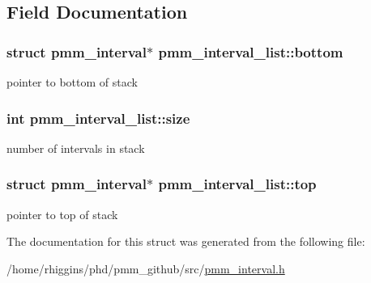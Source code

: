 \subsection{Field Documentation}
\hypertarget{structpmm__interval__list_ab3a8d91a9f36e0cf7d50aede9b0fc238}{
\subsubsection[{bottom}]{\setlength{\rightskip}{0pt plus 5cm}struct {\bf pmm\-\_\-interval}$\ast$ pmm\-\_\-interval\-\_\-list\-::bottom}}\label{structpmm__interval__list_ab3a8d91a9f36e0cf7d50aede9b0fc238}
pointer to bottom of stack \hypertarget{structpmm__interval__list_aadf8e9335403b3f0d3898e9d99c0b07d}{
\subsubsection[{size}]{\setlength{\rightskip}{0pt plus 5cm}int pmm\-\_\-interval\-\_\-list\-::size}}\label{structpmm__interval__list_aadf8e9335403b3f0d3898e9d99c0b07d}
number of intervals in stack \hypertarget{structpmm__interval__list_a659e2b8ffd36ea360d2a0259030f38c1}{
\subsubsection[{top}]{\setlength{\rightskip}{0pt plus 5cm}struct {\bf pmm\-\_\-interval}$\ast$ pmm\-\_\-interval\-\_\-list\-::top}}\label{structpmm__interval__list_a659e2b8ffd36ea360d2a0259030f38c1}
pointer to top of stack 

The documentation for this struct was generated from the following file\-:\begin{DoxyCompactItemize}
\item 
/home/rhiggins/phd/pmm\-\_\-github/src/\hyperlink{pmm__interval_8h}{pmm\-\_\-interval.\-h}\end{DoxyCompactItemize}
